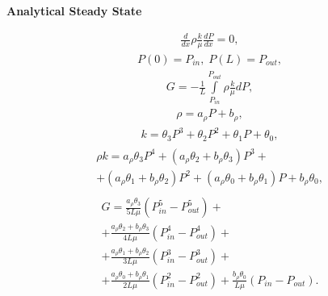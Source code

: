 \documentclass[a4paper,12pt]{extreport}
\begin{document}
\begin{multicols}{2}
\begin{center}
{\large \textbf{Analytical Steady State}}
\end{center}

\begin{eqnarray}
\label{eq:poisson_diff}
\frac{d}{dx}\rho\frac{k}{\mu} \frac{dP}{dx} = 0,
\end{eqnarray}
%
\begin{eqnarray}
\label{eq:poisson_diff_bound}
P\left(0\right) = P_{in}, \; P\left(L\right) = P_{out},
\end{eqnarray}
%
\begin{eqnarray}
\label{eq:consumption_poisson_diff_geniral}
G = - \frac{1}{L} \int \limits_{P_{in}}^{P_{out}} \rho\frac{k}{\mu} dP,
\end{eqnarray}
%
\begin{eqnarray}
\label{eq:poisson_dencity_particular}
\rho = a_{\rho}P + b_{\rho},
\end{eqnarray}
%
\begin{eqnarray}
\label{eq:poisson_permeability_particular}
k = \theta_{3}P^3 + \theta_{2}P^2 + \theta_{1}P + \theta_{0},
\end{eqnarray}
%
\begin{eqnarray}
\label{eq:poisson_rho_k_mu__particular}
\begin{gathered}
\rho k =  a_{\rho}\theta_{3}P^4 + \left( a_{\rho}\theta_{2} + b_{\rho}\theta_{3}\right)P^3 +\\
+ \left(a_{\rho}\theta_{1} + b_{\rho}\theta_{2}\right)P^2 +
    \left(a_{\rho}\theta_{0} + b_{\rho}\theta_{1}\right)P + b_{\rho}\theta_{0},
\end{gathered}
\end{eqnarray}
%
\begin{eqnarray}
\label{eq:consumption_poisson_diff_particular}
\begin{gathered}
G = \frac{a_{\rho}\theta_{3}}{5L\mu} \left(P_{in}^5 -P_{out}^5 \right) +\\
+\frac{a_{\rho}\theta_{2} + b_{\rho}\theta_{3}}{4L\mu} \left(P_{in}^4 -P_{out}^4 \right) +\\
+\frac{a_{\rho}\theta_{1} + b_{\rho}\theta_{2}}{3L\mu} \left(P_{in}^3 -P_{out}^3 \right) +\\
+\frac{a_{\rho}\theta_{0} + b_{\rho}\theta_{1}}{2L\mu} \left(P_{in}^2 -P_{out}^2 \right) +
  \frac{b_{\rho}\theta_{0}}{L\mu} \left(P_{in} -P_{out} \right).
\end{gathered}
\end{eqnarray}


\end{multicols}
\end{document}
